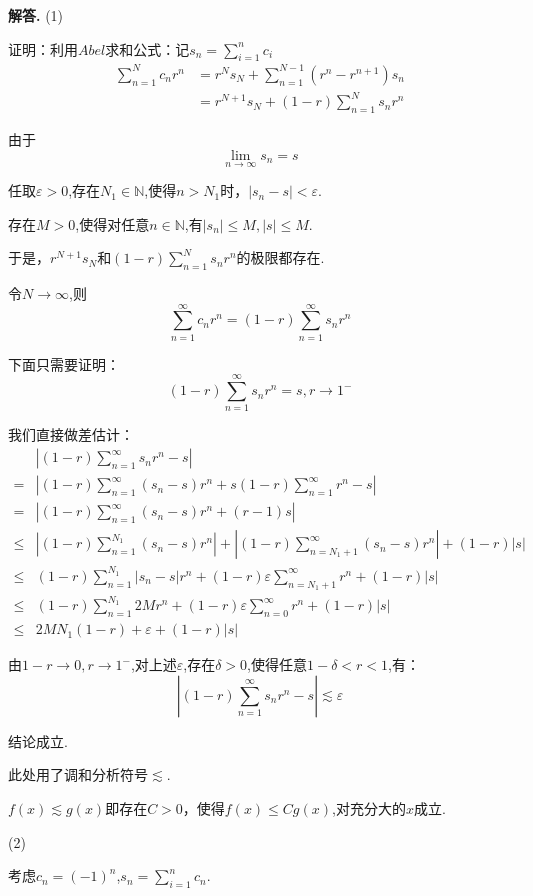 \documentclass[12pt, a4paper, oneside]{ctexart}
\newenvironment{solution}{\par\noindent\textbf{解答. }}{\par}
\begin{document}
\begin{solution}
(1)
\par
证明：利用$Abel$求和公式：记$s_n=\sum_{i=1}^{n}c_i$
$$
\begin{aligned}
\sum_{n=1}^{N}c_n r^n&=r^Ns_N+\sum_{n=1}^{N-1}(r^n-r^{n+1})s_n\\
&=r^{N+1}s_N+(1-r)\sum_{n=1}^{N}s_nr^n
\end{aligned}
$$
\par
由于$$
\lim_{n \to \infty}s_n=s
$$
\par
任取$\varepsilon>0$,存在$N_1\in \mathbb{N}$,使得$n>N_1$时，$|s_n-s|<\varepsilon$.
\par
存在$M>0$,使得对任意$n\in \mathbb{N}$,有$|s_n|\leqslant M, |s|\leqslant M$.
\par
于是，$r^{N+1}s_N$和$(1-r)\sum_{n=1}^{N}s_nr^n$的极限都存在.
\par
令$N\to \infty$,则
$$
\sum_{n=1}^{\infty}c_n r^n=(1-r)\sum_{n=1}^{\infty}s_nr^n
$$
\par
下面只需要证明：
$$
(1-r)\sum_{n=1}^{\infty}s_nr^n=s, r \to 1^-
$$
\par
我们直接做差估计：
$$
\begin{aligned}
&\left|(1-r)\sum_{n=1}^{\infty}s_nr^n-s\right|\\
=&\left|(1-r)\sum_{n=1}^{\infty}(s_n-s)r^n+s(1-r)\sum_{n=1}^{\infty}r^n-s\right|\\
=&\left|(1-r)\sum_{n=1}^{\infty}(s_n-s)r^n+(r-1)s\right|\\
\leqslant&\left|(1-r)\sum_{n=1}^{N_1}(s_n-s)r^n\right|
+\left|(1-r)\sum_{n=N_1+1}^{\infty}(s_n-s)r^n\right|+(1-r)|s|\\
\leqslant&(1-r)\sum_{n=1}^{N_1}|s_n-s|r^n+(1-r)\varepsilon\sum_{n=N_1+1}^{\infty}r^n+(1-r)|s|\\
\leqslant&(1-r)\sum_{n=1}^{N_1}2Mr^n+(1-r)\varepsilon\sum_{n=0}^{\infty}r^n+(1-r)|s|\\
\leqslant&2MN_1(1-r)+\varepsilon+(1-r)|s|
\end{aligned}
$$
\par
由$1-r\to 0, r\to 1^-$,对上述$\varepsilon$,存在$\delta>0$,使得任意$1-\delta<r<1$,有：
$$
\left|(1-r)\sum_{n=1}^{\infty}s_nr^n-s\right|\lesssim \varepsilon
$$
\par
结论成立.
\par
此处用了调和分析符号$\lesssim$.
\par
$f(x)\lesssim g(x)$即存在$C>0$，使得$f(x)\leqslant Cg(x)$,对充分大的$x$成立.
\par
(2)
\par
考虑$c_n=(-1)^n$,$s_n=\sum_{i=1}^{n}c_n$.

\end{solution}
\end{document}
